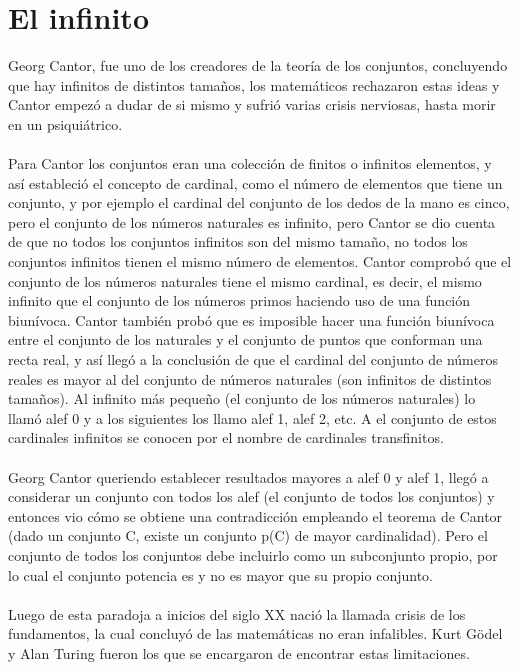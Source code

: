 \documentclass[11pt]{article}
\begin{document}
\section*{El infinito}
%
Georg Cantor, fue uno de los creadores de la teoría de los conjuntos, concluyendo que hay infinitos de distintos tamaños, los matemáticos rechazaron estas ideas y Cantor empezó a dudar  de si mismo y sufrió varias crisis nerviosas, hasta morir en un psiquiátrico.
%
\\\\
Para Cantor los conjuntos eran una colección de finitos o infinitos elementos, y así estableció el concepto de cardinal, como el número de elementos que tiene un conjunto, y por ejemplo el cardinal del conjunto de los dedos de la mano es cinco, pero el conjunto de los números naturales es infinito, pero Cantor se dio cuenta de que no todos los conjuntos infinitos son del mismo tamaño, no todos los conjuntos infinitos tienen el mismo número de elementos. Cantor comprobó que el conjunto de los números naturales tiene el mismo cardinal, es decir, el mismo infinito que el conjunto de los números primos haciendo uso de una función biunívoca. Cantor también probó que es imposible hacer una función biunívoca entre el conjunto de los naturales y el conjunto de puntos que conforman una recta real, y así llegó a la conclusión de que el cardinal del conjunto de números reales es mayor al del conjunto de números naturales (son infinitos de distintos tamaños). Al infinito más pequeño (el conjunto de los números naturales) lo llamó alef 0 y a los siguientes los llamo alef 1, alef 2, etc. A el conjunto de estos cardinales infinitos se conocen por el nombre de cardinales transfinitos.
%
\\\\
%
Georg Cantor queriendo establecer resultados mayores a alef 0 y alef 1, llegó a considerar un conjunto con todos los alef (el conjunto de todos los conjuntos) y entonces vio cómo se obtiene una contradicción empleando el teorema de Cantor (dado un conjunto C, existe un conjunto p(C) de mayor cardinalidad). Pero el conjunto de todos los conjuntos debe incluirlo como un subconjunto propio, por lo cual el conjunto potencia es y no es mayor que su propio conjunto.
%
\\\\
%
Luego de esta paradoja a inicios del siglo XX nació la llamada crisis de los fundamentos, la cual concluyó de las matemáticas no eran infalibles. Kurt Gödel y Alan Turing fueron los que se encargaron de encontrar estas limitaciones.
%
\end{document}
